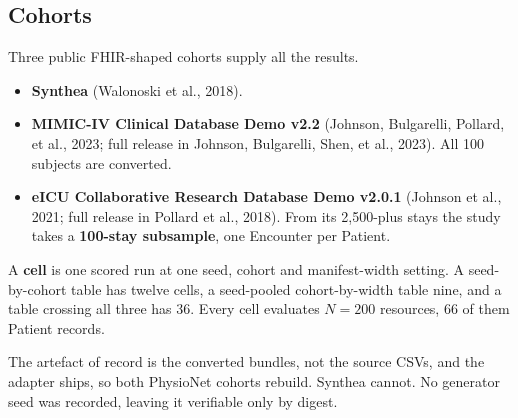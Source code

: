 \subsection{Cohorts}
\label{sec:data}

Three public FHIR-shaped cohorts supply all the results.

\begin{itemize}[leftmargin=1.4em, itemsep=0.15em]
  \item \textbf{Synthea} (Walonoski et al., 2018).
  \item \textbf{MIMIC-IV Clinical Database Demo v2.2} (Johnson, Bulgarelli, Pollard, et al., 2023;
        full release in Johnson, Bulgarelli, Shen, et al., 2023). All 100 subjects are converted.
  \item \textbf{eICU Collaborative Research Database Demo v2.0.1} (Johnson et al., 2021; full release
        in Pollard et al., 2018). From its 2{,}500-plus stays the study takes a
        \textbf{100-stay subsample}, one Encounter per Patient.
\end{itemize}

A \textbf{cell} is one scored run at one seed, cohort and manifest-width setting. A seed-by-cohort
table has twelve cells, a seed-pooled cohort-by-width table nine, and a table crossing all three has
36. Every cell evaluates $N = 200$ resources, 66 of them Patient records.

The artefact of record is the converted bundles, not the source CSVs, and the adapter ships, so both
PhysioNet cohorts rebuild. Synthea cannot. No generator seed was recorded, leaving it verifiable
only by digest.
